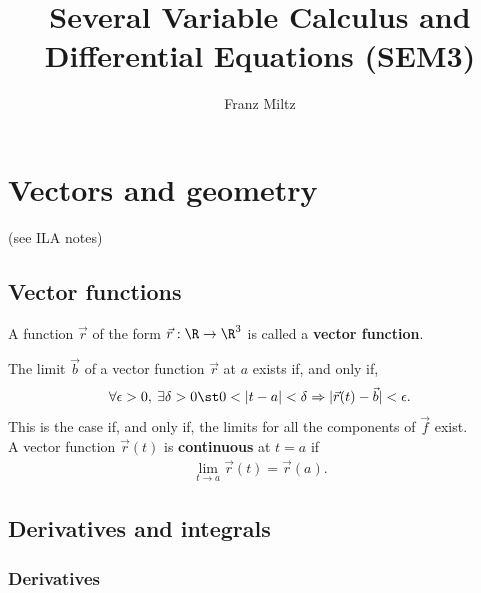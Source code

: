 \documentclass{article}
\begin{document}
\title{Several Variable Calculus and Differential Equations (SEM3)}
\author{Franz Miltz}
\maketitle
\tableofcontents
\pagebreak



\section{Vectors and geometry}



 (see ILA notes)
\setcounter{subsection}{4}


\subsection{Vector functions}


\begin{definition}
    A function $\vec r$ of the form $\vec r: \R \to \R^3$ is called a \textbf{vector function}.
\end{definition}
\begin{definition}
    The limit $\vec b$ of a vector function $\vec r$ at $a$ exists if, and only if,
    \begin{align*}
        \forall \epsilon > 0,\: \exists \delta > 0 \st 0 < |t-a| < \delta \Rightarrow |\vec r(t) - \vec b|<\epsilon.
    \end{align*}
    This is the case if, and only if, the limits for all the components of $\vec f$ exist.\\
    A vector function $\vec r(t)$ is \textbf{continuous} at $t=a$ if
    \begin{align*}
        \lim_{t\to a} \vec r (t) = \vec r (a).
    \end{align*}
\end{definition}


\subsection{Derivatives and integrals}


\subsubsection{Derivatives}
\end{document}
